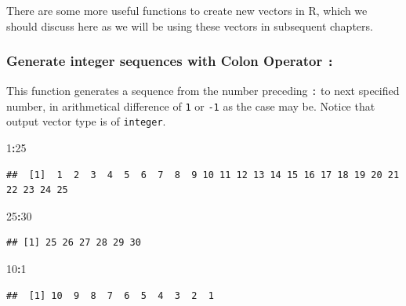\documentclass[
]{book}
\newenvironment{Shaded}{\begin{snugshade}}{\end{snugshade}}
\newcommand{\DecValTok}[1]{\textcolor[rgb]{0.00,0.00,0.81}{#1}}
\newcommand{\SpecialCharTok}[1]{\textcolor[rgb]{0.81,0.36,0.00}{\textbf{#1}}}
\begin{document}
There are some more useful functions to create new vectors in R, which we should discuss here as we will be using these vectors in subsequent chapters.

\hypertarget{generate-integer-sequences-with-colon-operator}{%
\subsubsection*{\texorpdfstring{Generate integer sequences with Colon Operator \texttt{:}}{Generate integer sequences with Colon Operator :}}\label{generate-integer-sequences-with-colon-operator}}

This function generates a sequence from the number preceding \texttt{:} to next specified number, in arithmetical difference of \texttt{1} or \texttt{-1} as the case may be. Notice that output vector type is of \texttt{integer}.

\begin{Shaded}
\begin{Highlighting}[]
\DecValTok{1}\SpecialCharTok{:}\DecValTok{25}
\end{Highlighting}
\end{Shaded}

\begin{verbatim}
##  [1]  1  2  3  4  5  6  7  8  9 10 11 12 13 14 15 16 17 18 19 20 21 22 23 24 25
\end{verbatim}

\begin{Shaded}
\begin{Highlighting}[]
\DecValTok{25}\SpecialCharTok{:}\DecValTok{30}
\end{Highlighting}
\end{Shaded}

\begin{verbatim}
## [1] 25 26 27 28 29 30
\end{verbatim}

\begin{Shaded}
\begin{Highlighting}[]
\DecValTok{10}\SpecialCharTok{:}\DecValTok{1}
\end{Highlighting}
\end{Shaded}

\begin{verbatim}
##  [1] 10  9  8  7  6  5  4  3  2  1
\end{verbatim}
\end{document}
